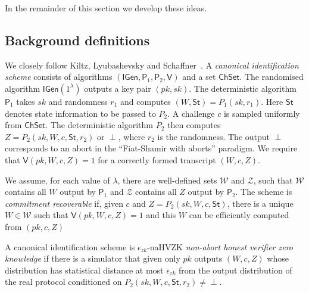 \documentclass{llncs}
\newcommand{\IGen}{\mathsf{IGen}}
\newcommand{\PP}{\mathsf{P}}
\newcommand{\VV}{\mathsf{V}}
\newcommand{\Wset}{\mathcal{W}}
\newcommand{\Zset}{\mathcal{Z}}
\newcommand{\ChSet}{\textsf{ChSet}}
\newcommand{\St}{\textsf{St}}
\begin{document}
In the remainder of this section we develop these ideas.


\subsection{Background definitions} \label{sec:KLS-defns}

We closely follow Kiltz, Lyubashevsky and Schaffner~\cite{KLS18}.
A \emph{canonical identification scheme} consists of algorithms $(\IGen, \PP_1, \PP_2, \VV)$ and a set $\ChSet$. The randomised algorithm $\IGen( 1^\lambda )$ outputs a key pair $(pk,sk)$.
The deterministic algorithm $\PP_1$ takes $sk$ and randomness $r_1$ and computes $(W, \St) = P_1( sk, r_1 )$. 
Here $\St$ denotes state information to be passed to $P_2$.
A challenge $c$ is sampled uniformly from $\ChSet$. The deterministic algorithm $P_2$ then computes $Z = P_2( sk, W, c, \St, r_2 )$ or $\perp$, where $r_2$ is the randomness.
The output $\perp$ corresponds to an abort in the ``Fiat-Shamir with aborts'' paradigm.
We require that $\VV( pk, W, c, Z ) = 1$ for a correctly formed transcript $(W,c,Z)$.

We assume, for each value of $\lambda$, there are well-defined sets $\Wset$ and $\Zset$, such that $\Wset$ contains all $W$ output by $\PP_1$ and $\Zset$ contains all $Z$ output by $\PP_2$. 
The scheme is \emph{commitment recoverable} if, given $c$ and $Z = P_2( sk, W, c, \St )$, there is a unique $W \in \Wset$ such that $\VV( pk, W, c, Z ) = 1$ and this $W$ can be efficiently computed from $(pk, c, Z)$

A canonical identification scheme is $\epsilon_{zk}$-naHVZK \emph{non-abort honest verifier zero knowledge} if there is a simulator that given only $pk$ outputs $(W, c, Z)$ whose distribution has statistical distance at most $\epsilon_{zk}$ from the output distribution of the real protocol conditioned on $P_2( sk, W, c, \St, r_2 ) \ne \perp$.

\end{document}
